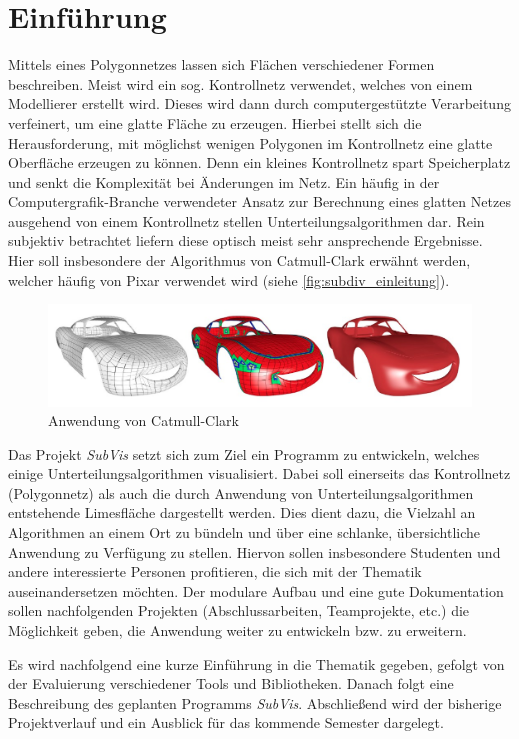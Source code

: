\chapter{Einführung}

Mittels eines Polygonnetzes lassen sich Flächen verschiedener Formen beschreiben. 
Meist wird ein sog. Kontrollnetz verwendet, welches von einem Modellierer erstellt wird.
Dieses wird dann durch computergestützte Verarbeitung verfeinert, um eine glatte Fläche zu erzeugen.
Hierbei stellt sich die Herausforderung, mit möglichst wenigen Polygonen im Kontrollnetz eine glatte Oberfläche erzeugen zu können.
Denn ein kleines Kontrollnetz spart Speicherplatz und senkt die Komplexität bei Änderungen im Netz.
Ein häufig in der Computergrafik-Branche verwendeter Ansatz zur Berechnung eines glatten Netzes ausgehend von einem Kontrollnetz stellen Unterteilungsalgorithmen dar.
Rein subjektiv betrachtet liefern diese optisch meist sehr ansprechende Ergebnisse.
Hier soll insbesondere der Algorithmus von Catmull-Clark erwähnt werden, welcher häufig von Pixar verwendet wird (siehe \autoref{fig:subdiv_einleitung}).

\begin{figure}
  \centering
  \includegraphics[width=\textwidth]{content/media/sd_einleitung.jpg}
  \caption{Anwendung von Catmull-Clark \cite{niessner2012feature}}
  \label{fig:subdiv_einleitung}
\end{figure}


Das Projekt \emph{SubVis} setzt sich zum Ziel ein Programm zu entwickeln, welches einige Unterteilungsalgorithmen visualisiert. 
Dabei soll einerseits das Kontrollnetz (Polygonnetz) als auch die durch Anwendung von Unterteilungsalgorithmen entstehende Limesfläche dargestellt werden.
Dies dient dazu, die Vielzahl an Algorithmen an einem Ort zu bündeln und über eine schlanke, übersichtliche Anwendung zu Verfügung zu stellen.
Hiervon sollen insbesondere Studenten und andere interessierte Personen profitieren, die sich mit der Thematik auseinandersetzen möchten.
Der modulare Aufbau und eine gute Dokumentation sollen nachfolgenden Projekten (Abschlussarbeiten, Teamprojekte, etc.) die Möglichkeit geben, die Anwendung weiter zu entwickeln bzw. zu erweitern.

Es wird nachfolgend eine kurze Einführung in die Thematik gegeben, gefolgt von der Evaluierung verschiedener Tools und Bibliotheken. 
Danach folgt eine Beschreibung des geplanten Programms \emph{SubVis}.
Abschließend wird der bisherige Projektverlauf und ein Ausblick für das kommende Semester dargelegt.